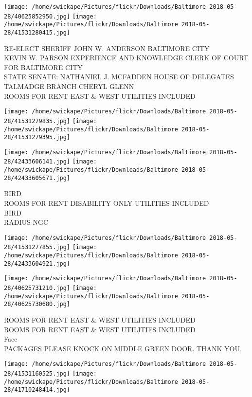 \documentclass[10pt,letterpaper]{article}
\begin{document}
\texttt{[image: /home/swickape/Pictures/flickr/Downloads/Baltimore 2018-05-28/40625852950.jpg]}
\texttt{[image: /home/swickape/Pictures/flickr/Downloads/Baltimore 2018-05-28/41531280415.jpg]}

RE{-}ELECT SHERIFF JOHN W. ANDERSON BALTIMORE CITY\\
KEVIN W. PARSON EXPERIENCE AND KNOWLEDGE CLERK OF COURT FOR BALTIMORE CITY\\
STATE SENATE: NATHANIEL J. MCFADDEN HOUSE OF DELEGATES TALMADGE BRANCH CHERYL GLENN\\
ROOMS FOR RENT EAST \& WEST UTILITIES INCLUDED
\pagebreak

\texttt{[image: /home/swickape/Pictures/flickr/Downloads/Baltimore 2018-05-28/41531279835.jpg]}
\texttt{[image: /home/swickape/Pictures/flickr/Downloads/Baltimore 2018-05-28/41531279395.jpg]}

\texttt{[image: /home/swickape/Pictures/flickr/Downloads/Baltimore 2018-05-28/42433606141.jpg]}
\texttt{[image: /home/swickape/Pictures/flickr/Downloads/Baltimore 2018-05-28/42433605671.jpg]}

BIRD\\
ROOMS FOR RENT DISABILITY ONLY UTILITIES INCLUDED\\
BIRD\\
RADIUS NGC
\pagebreak

\texttt{[image: /home/swickape/Pictures/flickr/Downloads/Baltimore 2018-05-28/41531277855.jpg]}
\texttt{[image: /home/swickape/Pictures/flickr/Downloads/Baltimore 2018-05-28/42433604921.jpg]}

\texttt{[image: /home/swickape/Pictures/flickr/Downloads/Baltimore 2018-05-28/40625731210.jpg]}
\texttt{[image: /home/swickape/Pictures/flickr/Downloads/Baltimore 2018-05-28/40625730680.jpg]}

ROOMS FOR RENT EAST \& WEST UTILITIES INCLUDED\\
ROOMS FOR RENT EAST \& WEST UTILITIES INCLUDED\\
Face\\
PACKAGES PLEASE KNOCK ON MIDDLE GREEN DOOR.  THANK YOU.
\pagebreak

\texttt{[image: /home/swickape/Pictures/flickr/Downloads/Baltimore 2018-05-28/41531160525.jpg]}
\texttt{[image: /home/swickape/Pictures/flickr/Downloads/Baltimore 2018-05-28/41710248414.jpg]}
\end{document}
